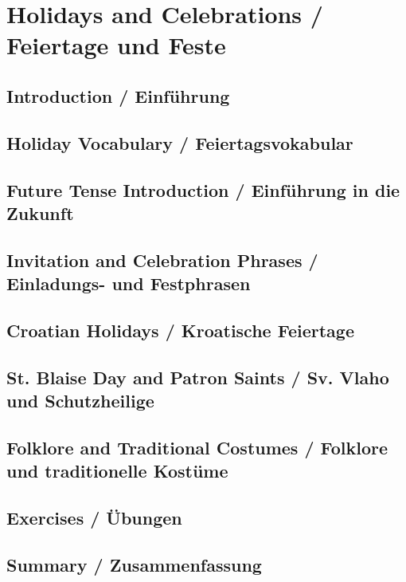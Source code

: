 \chapter{Holidays and Celebrations / Feiertage und Feste}

\section{Introduction / Einführung}

\section{Holiday Vocabulary / Feiertagsvokabular}

\section{Future Tense Introduction / Einführung in die Zukunft}

\section{Invitation and Celebration Phrases / Einladungs- und Festphrasen}

\section{Croatian Holidays / Kroatische Feiertage}

\section{St. Blaise Day and Patron Saints / Sv. Vlaho und Schutzheilige}

\section{Folklore and Traditional Costumes / Folklore und traditionelle Kostüme}

\section{Exercises / Übungen}

\section{Summary / Zusammenfassung}

